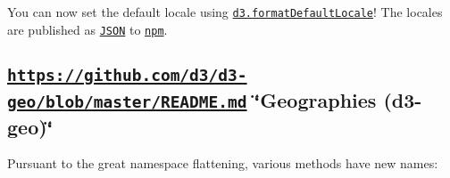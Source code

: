 You can now set the default locale using \href{https://github.com/d3/d3-format/blob/master/README.md#formatDefaultLocale}{\tt d3.\+format\+Default\+Locale}! The locales are published as \href{https://github.com/d3/d3-request/blob/master/README.md#json}{\tt J\+S\+ON} to \href{https://unpkg.com/d3-format/locale/}{\tt npm}.

\subsection*{\href{https://github.com/d3/d3-geo/blob/master/README.md}{\tt https\+://github.\+com/d3/d3-\/geo/blob/master/\+R\+E\+A\+D\+M\+E.\+md} \char`\"{}\+Geographies (d3-\/geo)\char`\"{}}

Pursuant to the great namespace flattening, various methods have new names\+:


